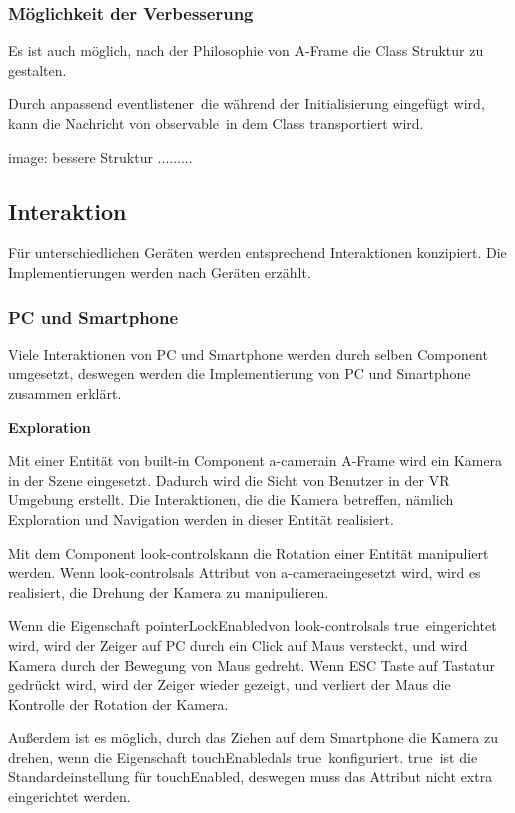  \subsubsection{Möglichkeit der Verbesserung}
 Es ist auch möglich, nach der Philosophie von A-Frame die Class Struktur zu gestalten.
 
 Durch anpassend \glqq eventlistener\grqq\, die während der Initialisierung eingefügt wird, kann die Nachricht von \glqq observable\grqq\ in dem Class transportiert wird.
 
 image: bessere Struktur .........
 
 \subsection{Interaktion}
  Für unterschiedlichen Geräten werden entsprechend Interaktionen konzipiert. Die Implementierungen werden nach Geräten erzählt.
  
  \subsubsection{PC und Smartphone}
  Viele Interaktionen von PC und Smartphone werden durch selben Component umgesetzt, deswegen werden die Implementierung von PC und Smartphone zusammen erklärt.
  
  \textbf{Exploration}
  
  Mit einer Entität von built-in Component \glqq a-camera\grqq in A-Frame wird ein Kamera in der Szene eingesetzt. Dadurch wird die Sicht von Benutzer in der VR Umgebung erstellt. Die Interaktionen, die die Kamera betreffen, nämlich Exploration und Navigation werden in dieser Entität realisiert.
  
  Mit dem Component \glqq look-controls\grqq kann die Rotation einer Entität manipuliert werden. Wenn \grqq look-controls\grqq als Attribut von \glqq a-camera\grqq eingesetzt wird, wird es realisiert, die Drehung der Kamera zu manipulieren.
  
  Wenn die Eigenschaft \glqq pointerLockEnabled\grqq von \glqq look-controls\grqq  als \glqq true\grqq\ eingerichtet wird, wird der Zeiger auf PC durch ein Click auf Maus versteckt, und wird Kamera durch der Bewegung von Maus gedreht. Wenn ESC Taste auf Tastatur gedrückt wird, wird der Zeiger wieder gezeigt, und verliert der Maus die Kontrolle der Rotation der Kamera.
  
  Außerdem ist es möglich, durch das Ziehen auf dem Smartphone die Kamera zu drehen, wenn die Eigenschaft \glqq touchEnabled\grqq als \glqq true\grqq\ konfiguriert. \glqq true\grqq\ ist die Standardeinstellung für \glqq touchEnabled\grqq, deswegen muss das Attribut nicht extra eingerichtet werden.
  
